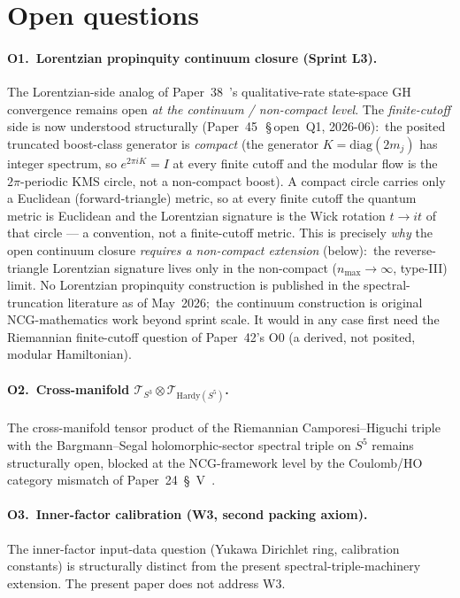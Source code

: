 \documentclass[11pt,a4paper]{article}
\theoremstyle{plain}
\theoremstyle{definition}
\newcommand{\sthree}{S^{3}}
\newcommand{\Tcal}{\mathcal{T}}
\begin{document}
\section{Open questions}\label{sec:open_questions}

\paragraph{O1.\ Lorentzian propinquity continuum closure (Sprint L3).}
The Lorentzian-side analog of Paper~38~\cite{paper38}'s qualitative-rate
state-space GH convergence remains open \emph{at the continuum / non-compact
level}. The \emph{finite-cutoff} side is now understood structurally
(Paper~45~\cite{paper45}\,\S\,open~Q1, 2026-06):\ the posited
truncated boost-class generator is \emph{compact} (the generator
$K = \mathrm{diag}(2m_{j})$ has integer spectrum, so $e^{2\pi i K} = I$ at
every finite cutoff and the modular flow is the $2\pi$-periodic KMS circle,
not a non-compact boost). A compact circle carries only a Euclidean
(forward-triangle) metric, so at every finite cutoff the quantum metric is
Euclidean and the Lorentzian signature is the Wick rotation $t \to it$ of
that circle --- a convention, not a finite-cutoff metric. This is precisely
\emph{why} the open continuum closure \emph{requires a non-compact extension}
(below):\ the reverse-triangle Lorentzian signature lives only in the
non-compact ($n_{\max} \to \infty$, type-III) limit. No Lorentzian
propinquity construction is published in the spectral-truncation literature
as of May~2026;\ the continuum construction is original NCG-mathematics work
beyond sprint scale.  It would in any case first need the Riemannian
finite-cutoff question of Paper~42's O0 (a derived, not posited,
modular Hamiltonian).

\paragraph{O2.\ Cross-manifold $\Tcal_{\sthree} \otimes
\Tcal_{\mathrm{Hardy}(S^5)}$.} The cross-manifold tensor product of
the Riemannian Camporesi--Higuchi triple with the Bargmann--Segal
holomorphic-sector spectral triple on $S^5$ remains structurally
open, blocked at the NCG-framework level by the Coulomb/HO category
mismatch of Paper~24~\S~V~\cite{paper24}.

\paragraph{O3.\ Inner-factor calibration (W3, second packing axiom).}
The inner-factor input-data question (Yukawa Dirichlet ring,
calibration constants) is structurally distinct from the present
spectral-triple-machinery extension. The present paper does not
address W3.
\end{document}
